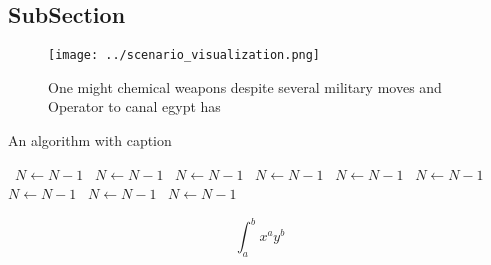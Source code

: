 \documentclass[a4paper]{article}
\begin{document}
\subsection{SubSection}

\begin{figure}
\centering
\texttt{[image: ../scenario\_visualization.png]}
\caption{One might chemical weapons despite several military moves and Operator to canal egypt has
}
\end{figure}
 
\begin{algorithm}
\caption{An algorithm with caption}
\begin{algorithmic}
\    \State $N \gets N - 1$
\    \State $N \gets N - 1$
\    \State $N \gets N - 1$
\    \State $N \gets N - 1$
\    \State $N \gets N - 1$
\    \State $N \gets N - 1$
\    \State $N \gets N - 1$
\    \State $N \gets N - 1$
\    \State $N \gets N - 1$
\EndWhile
\end{algorithmic}
\end{algorithm}

\[ \int_{a}^{b}{x^{a}y^{b}} \]
\end{document}
